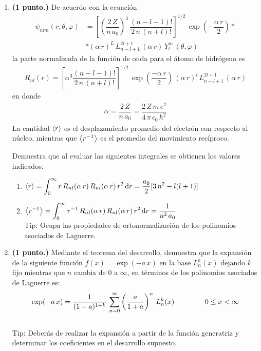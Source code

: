 \begin{enumerate}
\item \textbf{(1 punto.) } De acuerdo con la ecuación
\begin{align*}
\psi_{n l m} (r , \theta, \varphi) &= \left[ \left( \dfrac{2 \, Z}{n \, a_{0}} \right)^{3} \, \dfrac{(n - l -1)!}{2 \, n \, (n + l)!} \right]^{1/2} \, \exp \left( - \dfrac{\alpha \, r}{2} \right) * \\[1em]
&* (\alpha \, r)^{L} \, L_{n - l +1}^{2 l +1} \, (\alpha \, r) \, Y_{l}^{m} \, (\theta, \varphi)
\end{align*}
la parte normalizada de la función de onda para el átomo de hidrógeno es
\begin{align*}
R_{n l} (r) = \left[ \alpha^{3} \dfrac{(n -l -1)!}{2 \, n \, (n + l)!} \right]^{1/2} \, \exp \left( \dfrac{-\alpha \, r}{2} \right) \, (\alpha \, r)^{l} \, L_{n - l +1}^{2 l +1} \, (\alpha \, r) 
\end{align*}
en donde 
\begin{align*}
\alpha = \dfrac{2 \, Z}{n \, a_{0}} = \dfrac{2 \, Z \, m \, e^{2}}{4 \, \pi \, \epsilon_{0} \, \hbar^{2}}
\end{align*}
La cantidad $\expval{r}$ es el desplazamiento promedio del electrón con respecto al núcleo, mientras que $\expval{r^{-1}}$ es el promedio del movimiento recíproco.
\par
Demuestra que al evaluar las siguientes integrales se obtienen los valores indicados:
\begin{enumerate}
\item $\displaystyle \expval{r} = \int_{0}^{\infty} r \, R_{n l} (\alpha \, r) \, R_{n l} (\alpha \, r) \, r^{2} \dd{r} = \dfrac{a_{0}}{2} [3 \, n^{2} - l (l + 1)]$
\item $\displaystyle \expval{r^{-1}} = \int_{0}^{\infty} r^{-1} \, R_{n l} (\alpha \, r) \, R_{n l} (\alpha \, r) \, r^{2} \dd{r} = \dfrac{1}{n^{2} \, a_{0}}$
\\[0.5em]
Tip: Ocupa las propiedades de ortonormalización de los polinomios asociados de Laguerre.
\end{enumerate}
\item \textbf{(1 punto.) }Mediante el teorema del desarrollo, demuestra que la expansión de la siguiente función $f(x) = \exp(- a \, x)$ en la base $L_{n}^{k} (x)$ dejando $k$ fijo mientras que $n$ cambia de $0$ a $\infty$, en términos de los polinomios asociados de Laguerre es:
\begin{align*}
\exp(-a \, x) = \dfrac{1}{(1 + a)^{1 + k}} \, \sum_{n=0}^{\infty} \left( \dfrac{a}{1 + a} \right)^{n} \, L_{n}^{k} (x) \hspace{1.5cm} 0 \leq x < \infty
\end{align*}
\\[0.5em]
Tip: Deberás de realizar la expansión a partir de la función generatriz y determinar los coeficientes en el desarrollo supuesto.
\end{enumerate}

